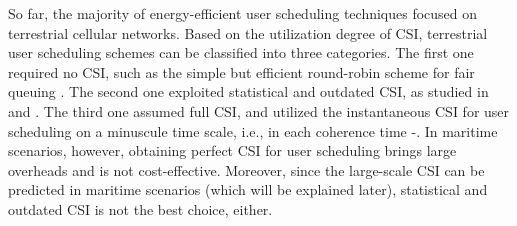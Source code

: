 \documentclass[conference]{IEEEtran}
\begin{document}
 So far, the majority of energy-efficient user scheduling techniques focused on terrestrial cellular networks. %
 Based on the utilization degree of CSI, terrestrial user scheduling schemes can be classified into three categories. The first one required no CSI, such as the simple but efficient round-robin scheme for fair queuing \cite{p51}. The second one exploited statistical and outdated CSI, as studied in \cite{p52} and \cite{p53}. The third one assumed full CSI, and utilized the instantaneous CSI for user scheduling on a minuscule time scale, i.e., in each coherence time \cite{p4}-\cite{p7}. 
 In maritime scenarios, however, obtaining perfect CSI for user scheduling brings large overheads and is not cost-effective.
 Moreover, since the large-scale CSI can be predicted in maritime scenarios (which will be explained later), statistical and outdated CSI is not the best choice, either. 
\end{document}
